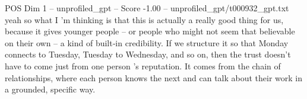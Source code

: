\begin{textsample}{POS Dim 1 – unprofiled\_gpt – Score -1.00 – unprofiled\_gpt/t000932\_gpt.txt}  \label{ex:f1_pos_030}
yeah so what I ’m thinking is that this is actually a really good thing for us, because it gives younger people – or people who might not seem that believable on their own – a kind of built‑in credibility.
If we structure it so that Monday connects to Tuesday, Tuesday to Wednesday, and so on, then the trust doesn't have to come just from one person ’s reputation.
It comes from the chain of relationships, where each person knows the next and can talk about their work in a grounded, specific way.

\end{textsample}
